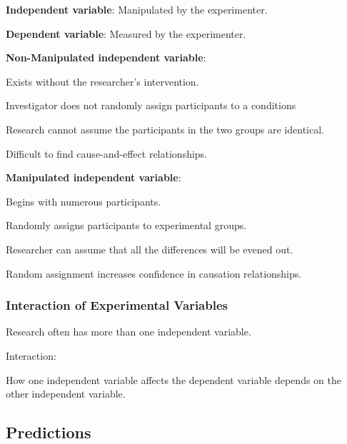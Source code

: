 \begin{coloredlist}
    \item \textbf{Independent variable}: Manipulated by the experimenter.
    \item \textbf{Dependent variable}: Measured by the experimenter.
    \item \textbf{Non-Manipulated independent variable}: 
    \begin{coloredlist}
        \item Exists without the researcher's intervention.
        \item Investigator does not randomly assign participants to a conditions
        \item Research cannot assume the participants in the two groups are identical.
        \item Difficult to find cause-and-effect relationships.
    \end{coloredlist}
    \item \textbf{Manipulated independent variable}:
    \begin{coloredlist}
        \item Begins with numerous participants.
        \item Randomly assigns participants to experimental groups.
        \item Researcher can assume that all the differences will be evened out.
        \item Random assignment increases confidence in causation relationships.
    \end{coloredlist}
\end{coloredlist}

\subsubsection{Interaction of Experimental Variables}

\begin{coloredlist}
    \item Research often has more than one independent variable.
    \item Interaction:
    \begin{coloredlist}
        \item How one independent variable affects the dependent variable depends on the other independent variable.
    \end{coloredlist}
\end{coloredlist}

\subsection{Predictions}


